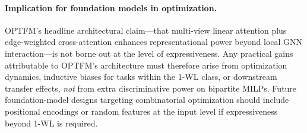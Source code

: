 \documentclass[11pt]{article}
\theoremstyle{plain}
\theoremstyle{definition}
\theoremstyle{remark}
\newcommand{\optfm}{\textsc{OPTFM}}
\begin{document}
\paragraph{Implication for foundation models in optimization.}
\optfm{}'s headline architectural claim---that multi-view linear attention
plus edge-weighted cross-attention enhances representational power
beyond local GNN interaction---is not borne out at the level of expressiveness.
Any practical gains attributable to \optfm{}'s architecture must therefore
arise from optimization dynamics, inductive biases for tasks within the 1-WL
class, or downstream transfer effects, \emph{not} from extra discriminative
power on bipartite MILPs. Future foundation-model designs targeting
combinatorial optimization should include positional encodings or random
features at the input level if expressiveness beyond 1-WL is required.
\end{document}
